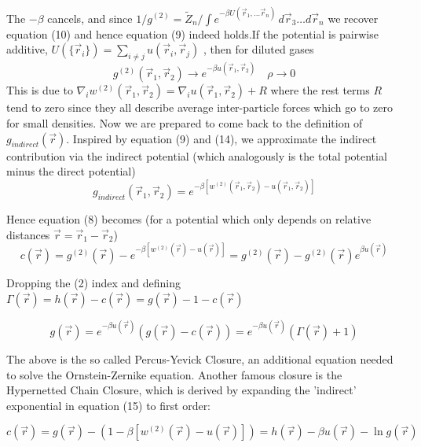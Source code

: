 \documentclass[11pt,a4paper]{article}
\begin{document}
The $-\beta$ cancels, and since $1/g^{(2)}  = \tilde Z_n / \int e^{-\beta U(\vec r_1, \dots \vec r_n)}\, d\vec r_3 \dots d\vec r_n$
we recover equation (10) and hence equation (9) indeed holds.\newline If the potential is pairwise additive, 
$U(\{\vec r_i\}) = \sum_{i \ne j} u(\vec r_i, \vec r_j)$ , then for diluted gases
\begin{equation}
g^{(2)}(\vec r_1, \vec r_2) \rightarrow e^{- \beta u(\vec r_1, \vec r_2)  }
\quad
\rho \rightarrow 0
\end{equation}
This is due to $\nabla_i w^{(2)}(\vec r_1, \vec r_2) = \nabla_i u(\vec r_1, \vec r_2) + R$ where the rest terms $R$ tend to zero since
they all describe average inter-particle forces which go to zero for small densities.\newline
Now we are prepared to come back to the definition of $g_{indirect} (\vec r)$. Inspired by equation (9) and (14), we approximate the indirect
contribution via the indirect potential (which analogously is the total potential minus the direct potential)
\begin{equation}
g_{indirect} (\vec r_1, \vec r_2) = e^{- \beta [w^{(2)}(\vec r_1, \vec r_2)  - u(\vec r_1, \vec r_2) ] }
\end{equation}

Hence equation (8) becomes (for a potential which only depends on relative distances $\vec r = \vec r_1 - \vec r_2$)
\begin{equation}
c(\vec r) = g^{(2)}(\vec r) - e^{- \beta [w^{(2)}(\vec r)  - u(\vec r) ] } =
g^{(2)}(\vec r) - g^{(2)}(\vec r) e^{\beta u(\vec r) }
\end{equation}

Dropping the (2) index and defining $\Gamma(\vec r) = h(\vec r) - c(\vec r) = g(\vec r) -1 - c(\vec r)$

\begin{equation}
g(\vec r) = e^{- \beta u(\vec r) }(g(\vec r) - c(\vec r)) =
e^{- \beta u(\vec r) }(\Gamma(\vec r) + 1)
\end{equation}

The above is the so called Percus-Yevick Closure, an additional equation needed to solve the Ornstein-Zernike equation. Another famous closure
is the Hypernetted Chain Closure, which is derived by expanding the 'indirect' exponential in equation (15) to first order:

\begin{equation}
c(\vec r) = g(\vec r) -
(1 - \beta [w^{(2)}(\vec r)  - u(\vec r) ]) =
h(\vec r) - \beta u(\vec r) -\ln g(\vec r)
\end{equation}
\end{document}
